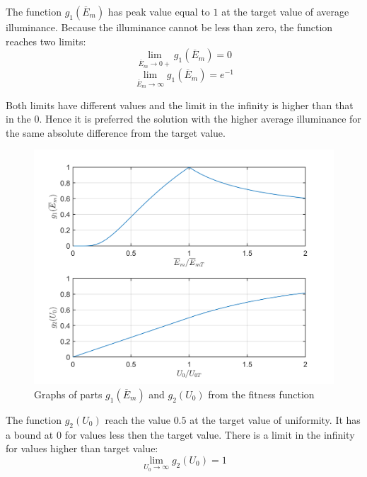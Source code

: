 The function $g_1\left(\overline{E}_{m}\right)$ has peak value equal to $1$ at the target value of average illuminance. Because the illuminance cannot be less than zero, the function reaches two limits:
\begin{equation}
\label{eq:g1lim0}
\lim_{\overline{E}_{m}\to 0+} g_1\left(\overline{E}_{m}\right) = 0
\end{equation}
\begin{equation}
\label{eq:g1limInf}
\lim_{\overline{E}_{m}\to \infty} g_1\left(\overline{E}_{m}\right) = e^{-1}
\end{equation}

Both limits have different values and the limit in the infinity is higher than that in the $0$. Hence it is preferred the solution with the higher average illuminance for the same absolute difference from the target value.

\begin{figure}[htb]
  \centering
  \includegraphics[width=\columnwidth]{obrG1G2}
  \caption{Graphs of parts $g_1\left(\overline{E}_{m}\right)$ and $g_2\left(U_0\right)$ from the fitness function}
  \label{fig:fitG1G2}
\end{figure}

The function $g_2\left(U_{0}\right)$ reach the value $0.5$ at the target value of uniformity. It has a bound at $0$ for values less then the target value. There is a limit in the infinity for values higher than target value:
\begin{equation}
\label{eq:g2limInf}
\lim_{U_{0}\to \infty} g_2\left(U_{0}\right) = 1
\end{equation}

